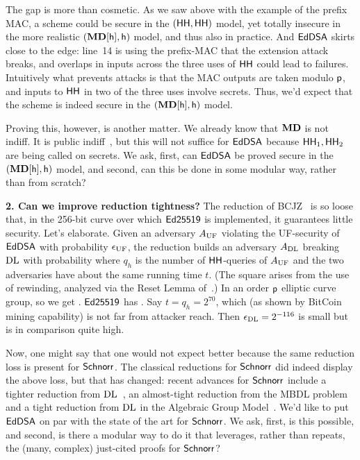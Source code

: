 The gap is more than cosmetic. As we saw above with the example of the prefix MAC, a scheme could be secure in the $(\mathsf{HH},\mathsf{HH})$ model, yet totally insecure in the more realistic $(\mathbf{MD}[\mathsf{h}],\mathsf{h})$ model, and thus also in practice. And $\mathsf{EdDSA}$ skirts close to the edge: line~14 is using the prefix-MAC that the extension attack breaks, and overlaps in inputs across the three uses of $\mathsf{HH}$ could lead to failures. Intuitively what prevents attacks is that the MAC outputs are taken modulo $\mathsf{p}$, and inputs to $\mathsf{HH}$ in two of the three uses involve secrets. Thus, we'd expect that the scheme is indeed secure in the $(\mathbf{MD}[\mathsf{h}],\mathsf{h})$ model. 

Proving this, however, is another matter. We already know that $\mathbf{MD}$ is not indiff. It is public indiff~\cite{EC:DodRisShr09,yoneyama2009leaky}, but this will not suffice for $\mathsf{EdDSA}$ because $\mathsf{HH}_1,\mathsf{HH}_2$ are being called on secrets. We ask, first, can $\mathsf{EdDSA}$ be proved secure in the $(\mathbf{MD}[\mathsf{h}],\mathsf{h})$ model, and second, can this be done in some modular way, rather than from scratch?

\medskip
\textbf{2. Can we improve reduction tightness?} The reduction of BCJZ~\cite{SP:BCJZ21} is so loose that, in the 256-bit curve over which $\mathsf{Ed25519}$ is implemented, it guarantees little security. Let's elaborate. Given an adversary $A_{\mathrm{UF}}$ violating the UF-security of $\mathsf{EdDSA}$ with probability $\epsilon_{\mathrm{UF}}$, the reduction builds an adversary $A_{\mathrm{DL}}$ breaking $\mathrm{DL}$ with probability  where $q_h$ is the number of $\mathsf{HH}$-queries of $A_{\mathrm{UF}}$ and the two adversaries have about the same running time $t$. (The square arises from the use of rewinding, analyzed via the Reset Lemma of~\cite{C:BelPal02}.) In an order $\mathsf{p}$ elliptic curve group,  so we get . $\mathsf{Ed25519}$ has . Say $t=q_h=2^{70}$, which (as shown by BitCoin mining capability) is not far from attacker reach. Then $\epsilon_{\mathrm{DL}} = 2^{-116}$ is small but  is in comparison quite high. 

Now, one might say that one would not expect better because the same reduction loss is present for $\mathsf{Schnorr}$. The classical reductions for $\mathsf{Schnorr}$ \cite{JC:PoiSte00,EC:AABN02} did indeed display the above loss, but that has changed: recent advances for $\mathsf{Schnorr}$ include a tighter reduction from $\mathrm{DL}$~\cite{C:RotSeg21}, an almost-tight reduction from the MBDL problem~\cite{INDOCRYPT:BelDai20} and a tight reduction from $\mathrm{DL}$ in the Algebraic Group Model~\cite{EC:FucPloSeu20}. We'd like to put $\mathsf{EdDSA}$ on par with the state of the art for $\mathsf{Schnorr}$. We ask, first, is this possible, and second, is there a modular way to do it that leverages, rather than repeats, the (many, complex) just-cited proofs for $\mathsf{Schnorr}$? 

